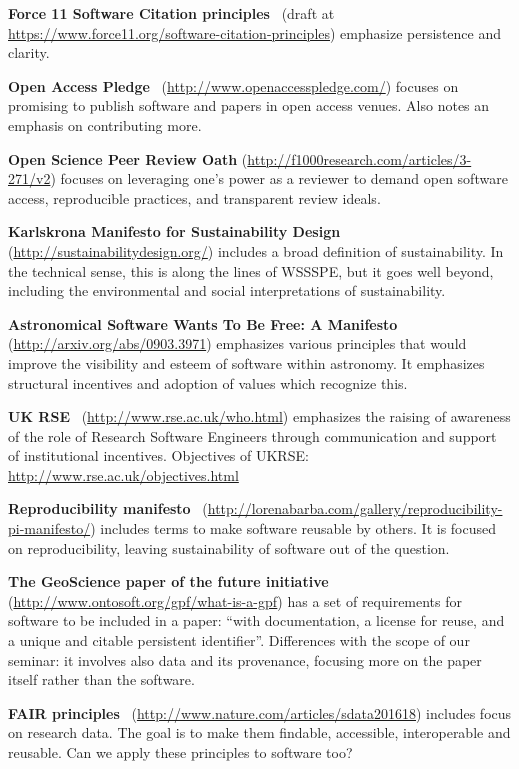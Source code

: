 \documentclass[a4paper,UKenglish]{dagman}
\newcommand{\manifesto}[1]{{\bf #1}\xspace}
\begin{document}
\begin{appendix}
\manifesto{Force 11 Software Citation principles}~\cite{arfon_m._smith_software_2016}
(draft at \url{https://www.force11.org/software-citation-principles})
emphasize persistence and clarity.

\manifesto{Open Access Pledge}~\cite{alex_holcombe_open_2011}
(\url{http://www.openaccesspledge.com/})
focuses on promising to publish software and papers in open access venues.
Also notes an emphasis on contributing more.

\manifesto{Open Science Peer Review Oath}
(\url{http://f1000research.com/articles/3-271/v2})
focuses on leveraging one's power as a reviewer to demand open software access, reproducible practices, and transparent review ideals.

\manifesto{Karlskrona Manifesto for Sustainability Design}~\cite{becker_karlskrona_2014}
(\url{http://sustainabilitydesign.org/})
includes a broad definition of sustainability. In the technical sense, this is along the lines of WSSSPE, but it goes well beyond, including the environmental and social interpretations of sustainability.

\manifesto{Astronomical Software Wants To Be Free: A Manifesto}~\cite{weiner_astronomical_2009}
(\url{http://arxiv.org/abs/0903.3971})
emphasizes various principles that would improve the visibility and esteem of software within astronomy. It emphasizes structural incentives and adoption of values which recognize this. 

\manifesto{UK RSE}~\cite{rse_conference_2016_what_2016}
(\url{http://www.rse.ac.uk/who.html})
emphasizes the raising of awareness of the role of Research Software Engineers through communication and support of institutional incentives.
Objectives of UKRSE: \url{http://www.rse.ac.uk/objectives.html}

\manifesto{Reproducibility manifesto}~\cite{barba_reproducibility_2012}
(\url{http://lorenabarba.com/gallery/reproducibility-pi-manifesto/})
includes terms to make software reusable by others. It is focused on reproducibility, leaving sustainability of software out of the question.

\manifesto{The GeoScience paper of the future initiative}~\cite{onto_soft_what_2016}
(\url{http://www.ontosoft.org/gpf/what-is-a-gpf})
has a set of requirements for software to be included in a paper: ``with documentation, a license for reuse, and a unique and citable persistent identifier''. Differences with the scope of our seminar: it involves also data and its provenance, focusing more on the paper itself rather than the software.

\manifesto{FAIR principles}~\cite{wilkinson_fair_2016}
(\url{http://www.nature.com/articles/sdata201618})
includes focus on research data. The goal is to make them findable, accessible, interoperable and reusable. Can we apply these principles to software too?


% 



\end{appendix}
\end{document}
